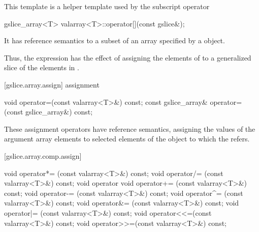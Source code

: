 \pnum
This template is a helper template used by the
subscript operator

%
%
\begin{itemdecl}
gslice_array<T> valarray<T>::operator[](const gslice&);
\end{itemdecl}

\begin{itemdescr}
\pnum
It has reference semantics to a subset of an array specified by a
object.

\pnum
Thus, the expression
has the effect of assigning the elements of
to a
generalized slice of the elements in
.
\end{itemdescr}

[gslice.array.assign]{ assignment}

%
\begin{itemdecl}
void operator=(const valarray<T>&) const;
const gslice_array& operator=(const gslice_array&) const;
\end{itemdecl}

\begin{itemdescr}
\pnum
These assignment operators have reference semantics, assigning the values
of the argument array elements to selected elements of the
object to which the
refers.
\end{itemdescr}

[gslice.array.comp.assign]{}

%
%
%
%
%
%
%
%
%
%
\begin{itemdecl}
void operator*= (const valarray<T>&) const;
void operator/= (const valarray<T>&) const;
void operator%
void operator+= (const valarray<T>&) const;
void operator-= (const valarray<T>&) const;
void operator^= (const valarray<T>&) const;
void operator&= (const valarray<T>&) const;
void operator|= (const valarray<T>&) const;
void operator<<=(const valarray<T>&) const;
void operator>>=(const valarray<T>&) const;
\end{itemdecl}


